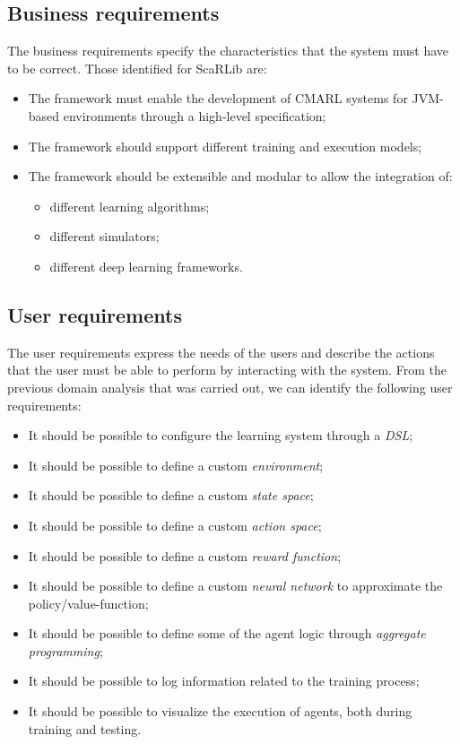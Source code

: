 \documentclass[12pt,a4paper,openright,twoside]{book}
\begin{document}
\subsection*{Business requirements}
The business requirements specify the characteristics that the system must have to be correct. Those identified for ScaRLib are:
\begin{itemize}
    \item The framework must enable the development of CMARL systems for JVM-based environments 
        through a high-level specification;
    \item The framework should support different training and execution models;
    \item The framework should be extensible and modular to allow  the integration of:
    \begin{itemize}
        \item different learning algorithms;
        \item different simulators;
        \item different deep learning frameworks.
    \end{itemize}
\end{itemize}

\subsection*{User requirements}
The user requirements express the needs of the users and describe the actions that the user must be able to perform by interacting with the system.
    From the previous domain analysis that was carried out, we can identify the following user requirements:
\begin{itemize}
    \item It should be possible to configure the learning system through a \emph{DSL};
    \item It should be possible to define a custom \emph{environment};
    \item It should be possible to define a custom \emph{state space};
    \item It should be possible to define a custom \emph{action space};
    \item It should be possible to define a custom \emph{reward function};
    \item It should be possible to define a custom \emph{neural network} to approximate the policy/value-function;
    \item It should be possible to define some of the agent logic through \emph{aggregate programming};
    \item It should be possible to log information related to the training process;
    \item It should be possible to visualize the execution of agents, both during training and testing.
\end{itemize}
\end{document}
